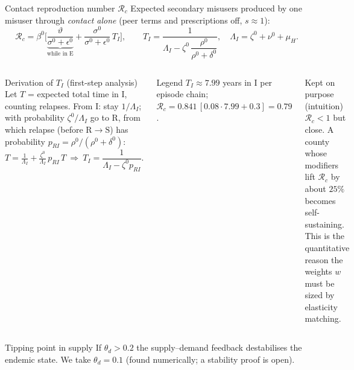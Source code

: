 ﻿\documentclass[9pt,aspectratio=169]{beamer}
\newenvironment{kept}{\begin{exampleblock}{Kept on purpose (intuition)}\small}{\end{exampleblock}}
\newenvironment{legend}{\begin{block}{Legend}\scriptsize}{\end{block}}
\newcommand{\Sc}{\mathrm{S}}\newcommand{\Ec}{\mathrm{E}}\newcommand{\Ic}{\mathrm{I}}\newcommand{\Rc}{\mathrm{R}}\newcommand{\Dc}{\mathrm{D}}
\newcommand{\Rzero}{\mathcal R_c}
\begin{document}
\begin{frame}{Contact reproduction number $\Rzero$}
 Expected secondary misusers produced by one misuser through \emph{contact alone} (peer terms and prescriptions off, $s\approx1$):
 \[
  \Rzero=\beta^0\Big[\underbrace{\frac{\vartheta}{\sigma^0+\epsilon^0}}_{\text{while in }\Ec}+\frac{\sigma^0}{\sigma^0+\epsilon^0}\,T_I\Big],\qquad
  T_I=\frac{1}{\Lambda_I-\zeta^0\,\dfrac{\rho^0}{\rho^0+\delta^0}},\quad \Lambda_I=\zeta^0+\nu^0+\mu_H .
 \]
 \begin{columns}[T]
 \begin{block}{Derivation of $T_I$ (first-step analysis)}\scriptsize
  Let $T$ = expected total time in $\Ic$, counting relapses. From $\Ic$: stay $1/\Lambda_I$; with probability $\zeta^0/\Lambda_I$ go to $\Rc$, from which relapse (before $\Rc\to\Sc$) has probability $p_{RI}=\rho^0/(\rho^0+\delta^0)$:
  \[T=\tfrac1{\Lambda_I}+\tfrac{\zeta^0}{\Lambda_I}\,p_{RI}\,T\ \Rightarrow\ T_I=\frac{1}{\Lambda_I-\zeta^0p_{RI}}.\]
 \end{block}
 \begin{legend}
 $T_I\approx 7.99$ years in $\Ic$ per episode chain; $\Rzero=0.841\,[0.08\cdot7.99+0.3]=0.79$.
 \end{legend}
 \begin{kept}
  $\Rzero<1$ but close. A county whose modifiers lift $\Rzero$ by about $25\%$ becomes self-sustaining. This is the quantitative reason the weights $w$ must be sized by elasticity matching.
 \end{kept}
 \end{columns}
 \begin{block}{Tipping point in supply}\scriptsize
  If $\theta_d>0.2$ the supply--demand feedback destabilises the endemic state. We take $\theta_d=0.1$ (found numerically; a stability proof is open).
 \end{block}
\end{frame}

\end{document}
